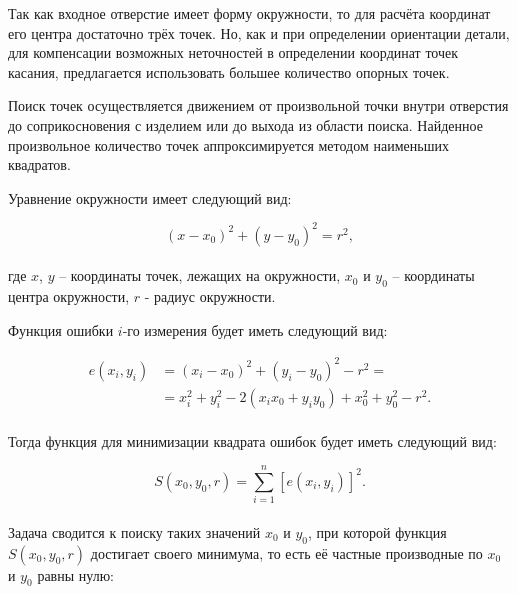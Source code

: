 Так как входное отверстие имеет форму окружности, то для расчёта координат его центра достаточно трёх точек.
Но, как и при определении ориентации детали, для компенсации возможных неточностей в определении координат точек касания, предлагается использовать большее количество опорных точек.

Поиск точек осуществляется движением от произвольной точки внутри отверстия до соприкосновения с изделием или до выхода из области поиска.
Найденное произвольное количество точек аппроксимируется методом наименьших квадратов.

Уравнение окружности имеет следующий вид:

\begin{equation*}
    \left( x - x_0 \right)^2 + \left( y - y_0 \right)^2 = r^2,
\end{equation*} \\
где $x$, $y$ -- координаты точек, лежащих на окружности, $x_0$ и $y_0$ -- координаты центра окружности, $r$ - радиус окружности.

Функция ошибки $i$-го измерения будет иметь следующий вид:

\begin{equation}
    \begin{aligned}
        \label{eq:Circle_MNK_e}
        e(x_i, y_i) &= \left( x_i - x_0 \right)^2 + \left( y_i - y_0 \right)^2 - r^2 = \\
        &= x_i^2 + y_i^2 - 2 (x_i x_0 + y_i y_0) + x_0^2 + y_0^2 - r^2.
    \end{aligned}
\end{equation} \\

Тогда функция для минимизации квадрата ошибок будет иметь следующий вид:

\begin{equation*}
    S(x_0, y_0, r) = \sum_{i=1}^{n} \left[ e(x_i, y_i) \right]^2.
\end{equation*} \\

Задача сводится к поиску таких значений $x_0$ и $y_0$, при которой функция $S(x_0, y_0, r)$ достигает своего минимума, то есть её частные производные по $x_0$ и $y_0$ равны нулю:


